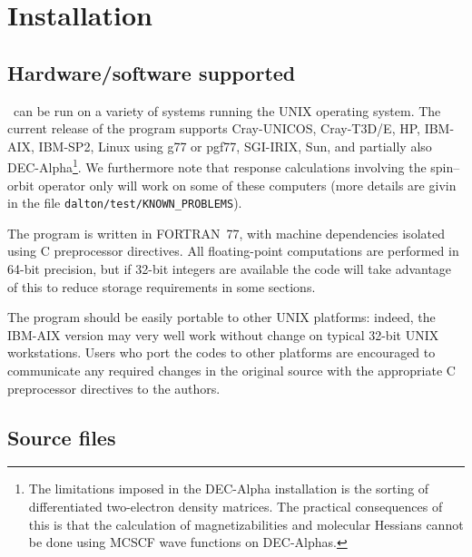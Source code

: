 \chapter{Installation}\label{ch:install}

\section{Hardware/software
supported}\label{sec:hardsoft}

\dalton\ can be run on a variety of systems running the UNIX operating
system.  The current release of the program supports
Cray-UNICOS,
Cray-T3D/E,
HP,
IBM-AIX,
IBM-SP2,
Linux using g77 or pgf77,
SGI-IRIX,
Sun,
and partially also
DEC-Alpha\footnote{The limitations imposed in the
DEC-Alpha installation is the sorting of differentiated two-electron
density matrices. The practical consequences of this is that the
calculation of magnetizabilities and molecular
Hessians cannot be done
using MCSCF wave functions on DEC-Alphas.}.
We furthermore note that response calculations involving the
spin--orbit operator only will work on some of these
computers (more details are givin in the file
\verb|dalton/test/KNOWN_PROBLEMS|).

The program is written in FORTRAN~77, with
machine dependencies isolated using C preprocessor directives.  All floating-point computations are
performed in 64-bit precision, but if 32-bit integers are
available the code will take advantage of this to reduce storage
requirements in some sections.

The program should be easily portable to other UNIX
platforms: indeed, the IBM-AIX version
may very well work without change on typical 32-bit UNIX workstations.
Users who port the codes to other platforms are encouraged to
communicate any required changes in the original source with the
appropriate C preprocessor directives to the authors.

\section{Source files}\label{sec:source}

